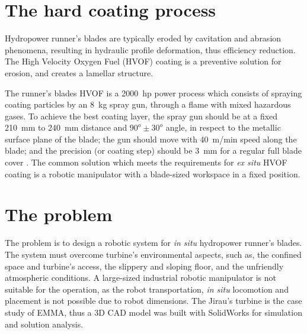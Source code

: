 \section{The hard coating process}\label{hvof}

Hydropower runner's blades are typically eroded by cavitation and abrasion
phenomena, resulting in hydraulic profile deformation, thus efficiency
reduction. The High Velocity Oxygen Fuel (HVOF) coating is a preventive
solution for erosion, and creates a lamellar structure. 

The runner's blades HVOF is a 2000~hp power process which consists of
spraying coating particles by an 8~kg spray gun, through a flame with mixed
hazardous gases. To achieve the best coating layer, the spray gun should be at
a fixed 210~mm to 240~mm distance and $90^o \pm 30^o$ angle, in respect to the
metallic surface plane of the blade; the gun should move with 40~m/min speed
along the blade; and the precision (or coating step) should be 3~mm for a
regular full blade cover \cite{li2002effect}. The
common solution which meets the requirements for \textit{ex situ} HVOF coating
is a robotic manipulator with a blade-sized workspace in a fixed position.

\section{The problem}\label{problem}

The problem is to design a robotic system for \textit{in situ}
hydropower runner's blades. The system must overcome turbine's environmental
aspects, such as, the confined space and turbine's access, the slippery and
sloping floor, and the unfriendly atmospheric conditions. A large-sized industrial
robotic manipulator is not suitable for the operation, as the robot
transportation, \textit{in situ} locomotion and placement is not possible due
to robot dimensions. The Jirau's turbine is the case study of EMMA,
thus a 3D CAD model was built with SolidWorks\raisebox{1ex}{\textregistered}
for simulation and solution analysis.


